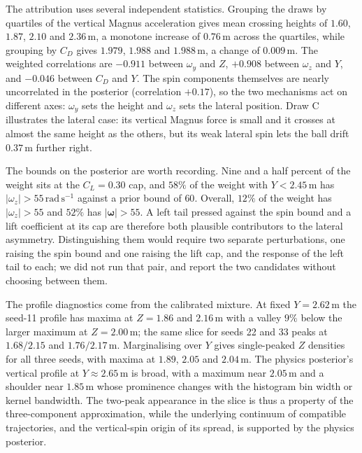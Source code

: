 \documentclass[11pt,a4paper]{article}
\begin{document}
The attribution uses several independent statistics. Grouping the draws by quartiles of the vertical Magnus acceleration gives mean crossing heights of $1.60$, $1.87$, $2.10$ and $2.36\,\mathrm{m}$, a monotone increase of $0.76\,\mathrm{m}$ across the quartiles, while grouping by $C_D$ gives $1.979$, $1.988$ and $1.988\,\mathrm{m}$, a change of $0.009\,\mathrm{m}$. The weighted correlations are $-0.911$ between $\omega_y$ and $Z$, $+0.908$ between $\omega_z$ and $Y$, and $-0.046$ between $C_D$ and $Y$. The spin components themselves are nearly uncorrelated in the posterior (correlation $+0.17$), so the two mechanisms act on different axes: $\omega_y$ sets the height and $\omega_z$ sets the lateral position. Draw C illustrates the lateral case: its vertical Magnus force is small and it crosses at almost the same height as the others, but its weak lateral spin lets the ball drift $0.37\,\mathrm{m}$ further right.

The bounds on the posterior are worth recording. Nine and a half percent of the weight sits at the $C_L=0.30$ cap, and $58\%$ of the weight with $Y<2.45\,\mathrm{m}$ has $|\omega_z|>55\,\mathrm{rad\,s^{-1}}$ against a prior bound of $60$. Overall, $12\%$ of the weight has $|\omega_z|>55$ and $52\%$ has $|\boldsymbol{\omega}|>55$. A left tail pressed against the spin bound and a lift coefficient at its cap are therefore both plausible contributors to the lateral asymmetry. Distinguishing them would require two separate perturbations, one raising the spin bound and one raising the lift cap, and the response of the left tail to each; we did not run that pair, and report the two candidates without choosing between them.

The profile diagnostics come from the calibrated mixture. At fixed $Y=2.62\,\mathrm{m}$ the seed-11 profile has maxima at $Z=1.86$ and $2.16\,\mathrm{m}$ with a valley $9\%$ below the larger maximum at $Z=2.00\,\mathrm{m}$; the same slice for seeds 22 and 33 peaks at $1.68/2.15$ and $1.76/2.17\,\mathrm{m}$. Marginalising over $Y$ gives single-peaked $Z$ densities for all three seeds, with maxima at $1.89$, $2.05$ and $2.04\,\mathrm{m}$. The physics posterior's vertical profile at $Y\approx2.65\,\mathrm{m}$ is broad, with a maximum near $2.05\,\mathrm{m}$ and a shoulder near $1.85\,\mathrm{m}$ whose prominence changes with the histogram bin width or kernel bandwidth. The two-peak appearance in the slice is thus a property of the three-component approximation, while the underlying continuum of compatible trajectories, and the vertical-spin origin of its spread, is supported by the physics posterior.

\clearpage

\end{document}
